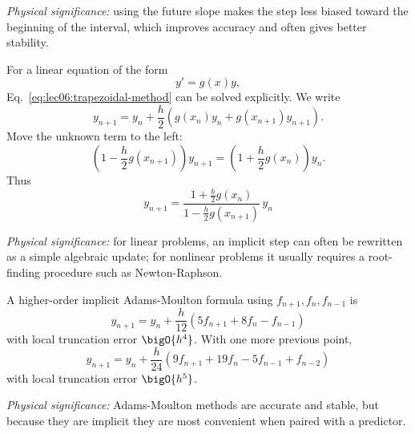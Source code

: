 \textit{Physical significance:} using the future slope makes the step less
biased toward the beginning of the interval, which improves accuracy and
often gives better stability.

For a linear equation of the form
\begin{equation}
    y'=g(x)y,
    \label{eq:lec06:linear-ode-g}
\end{equation}
Eq.~\eqref{eq:lec06:trapezoidal-method} can be solved explicitly. We write
\begin{equation}
    y_{n+1}
    =y_n+\frac{h}{2}\left(g(x_n)y_n+g(x_{n+1})y_{n+1}\right).
    \label{eq:lec06:trapezoidal-linear-start}
\end{equation}
Move the unknown term to the left:
\begin{equation}
    \left(1-\frac{h}{2}g(x_{n+1})\right)y_{n+1}
    =\left(1+\frac{h}{2}g(x_n)\right)y_n.
    \label{eq:lec06:trapezoidal-linear-solve}
\end{equation}
Thus
\begin{equation}
    \boxed{
    y_{n+1}
    =
    \frac{1+\frac{h}{2}g(x_n)}
         {1-\frac{h}{2}g(x_{n+1})}\,y_n}
    \label{eq:lec06:trapezoidal-linear-result}
\end{equation}

\textit{Physical significance:} for linear problems, an implicit step can
often be rewritten as a simple algebraic update; for nonlinear problems it
usually requires a root-finding procedure such as Newton-Raphson.

A higher-order implicit Adams-Moulton formula using
$f_{n+1},f_n,f_{n-1}$ is
\begin{equation}
    \boxed{
    y_{n+1}
    =y_n+\frac{h}{12}\left(5f_{n+1}+8f_n-f_{n-1}\right)}
    \label{eq:lec06:am3}
\end{equation}
with local truncation error $\bigO{h^4}$. With one more previous point,
\begin{equation}
    \boxed{
    y_{n+1}
    =y_n+\frac{h}{24}\left(9f_{n+1}+19f_n-5f_{n-1}+f_{n-2}\right)}
    \label{eq:lec06:am4}
\end{equation}
with local truncation error $\bigO{h^5}$.

\textit{Physical significance:} Adams-Moulton methods are accurate and
stable, but because they are implicit they are most convenient when paired
with a predictor.

